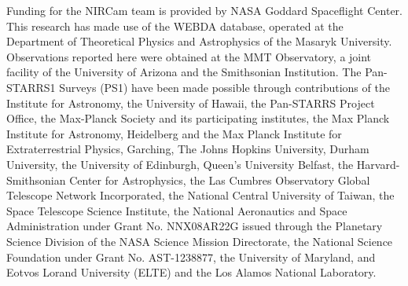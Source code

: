 \documentclass{aastex6}
\begin{document}
Funding for the NIRCam team is provided by NASA Goddard Spaceflight Center. This research has made use of the WEBDA database, operated at the Department of Theoretical Physics and Astrophysics of the Masaryk University.
Observations reported here were obtained at the MMT Observatory, a joint facility of the University of Arizona and the Smithsonian Institution.
The Pan-STARRS1 Surveys (PS1) have been made possible through contributions of the Institute for Astronomy, the University of Hawaii, the Pan-STARRS Project Office, the Max-Planck Society and its participating institutes, the Max Planck Institute for Astronomy, Heidelberg and the Max Planck Institute for Extraterrestrial Physics, Garching, The Johns Hopkins University, Durham University, the University of Edinburgh, Queen's University Belfast, the Harvard-Smithsonian Center for Astrophysics, the Las Cumbres Observatory Global Telescope Network Incorporated, the National Central University of Taiwan, the Space Telescope Science Institute, the National Aeronautics and Space Administration under Grant No. NNX08AR22G issued through the Planetary Science Division of the NASA Science Mission Directorate, the National Science Foundation under Grant No. AST-1238877, the University of Maryland, and Eotvos Lorand University (ELTE) and the Los Alamos National Laboratory. 





\end{document}
